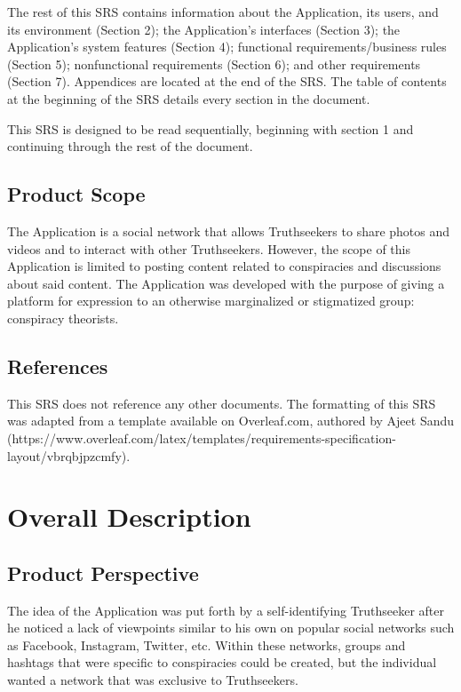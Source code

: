 The rest of this SRS contains information about the Application, its users, and its environment (Section 2); the Application’s interfaces (Section 3); the Application’s system features (Section 4); functional requirements/business rules (Section 5); nonfunctional requirements (Section 6); and other requirements (Section 7). Appendices are located at the end of the SRS. The table of contents at the beginning of the SRS details every section in the document.

This SRS is designed to be read sequentially, beginning with section 1 and continuing through the rest of the document.

\section{Product Scope}

The Application is a social network that allows Truthseekers to share photos and videos and to interact with other Truthseekers. However, the scope of this Application is limited to posting content related to conspiracies and discussions about said content. The Application was developed with the purpose of giving a platform for expression to an otherwise marginalized or stigmatized group: conspiracy theorists.

\section{References}

This SRS does not reference any other documents. The formatting of this SRS was adapted from a template available on Overleaf.com, authored by Ajeet Sandu (https://www.overleaf.com/latex/templates/requirements-specification-layout/vbrqbjpzcmfy).

\chapter{Overall Description}
\label{Overall Description}

\section{Product Perspective}

The idea of the Application was put forth by a self-identifying Truthseeker after he noticed a lack of viewpoints similar to his own on popular social networks such as Facebook, Instagram, Twitter, etc. Within these networks, groups and hashtags that were specific to conspiracies could be created, but the individual wanted a network that was exclusive to Truthseekers. 

